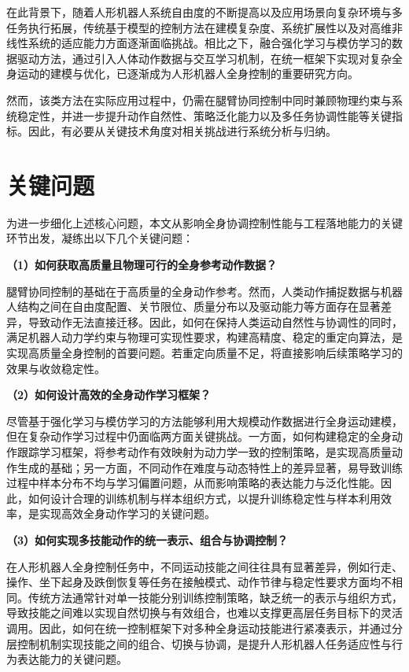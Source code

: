在此背景下，随着人形机器人系统自由度的不断提高以及应用场景向复杂环境与多任务执行拓展，传统基于模型的控制方法在建模复杂度、系统扩展性以及对高维非线性系统的适应能力方面逐渐面临挑战。相比之下，融合强化学习与模仿学习的数据驱动方法，通过引入人体动作数据与交互学习机制，在统一框架下实现对复杂全身运动的建模与优化，已逐渐成为人形机器人全身控制的重要研究方向。

然而，该类方法在实际应用过程中，仍需在腿臂协同控制中同时兼顾物理约束与系统稳定性，并进一步提升动作自然性、策略泛化能力以及多任务协调性能等关键指标。因此，有必要从关键技术角度对相关挑战进行系统分析与归纳。

\section{关键问题}

为进一步细化上述核心问题，本文从影响全身协调控制性能与工程落地能力的关键环节出发，凝练出以下几个关键问题：

\textbf{（1）如何获取高质量且物理可行的全身参考动作数据？}

腿臂协同控制的基础在于高质量的全身动作参考。然而，人类动作捕捉数据与机器人结构之间在自由度配置、关节限位、质量分布以及驱动能力等方面存在显著差异，导致动作无法直接迁移。因此，如何在保持人类运动自然性与协调性的同时，满足机器人动力学约束与物理可实现性要求，构建高精度、稳定的重定向算法，是实现高质量全身控制的首要问题。若重定向质量不足，将直接影响后续策略学习的效果与收敛稳定性。


\textbf{（2）如何设计高效的全身动作学习框架？}

尽管基于强化学习与模仿学习的方法能够利用大规模动作数据进行全身运动建模，但在复杂动作学习过程中仍面临两方面关键挑战。一方面，如何构建稳定的全身动作跟踪学习框架，将参考动作有效映射为动力学一致的控制策略，是实现高质量动作生成的基础；另一方面，不同动作在难度与动态特性上的差异显著，易导致训练过程中样本分布不均与学习偏置问题，从而影响策略的表达能力与泛化性能。因此，如何设计合理的训练机制与样本组织方式，以提升训练稳定性与样本利用效率，是实现高效全身动作学习的关键问题。

\textbf{（3）如何实现多技能动作的统一表示、组合与协调控制？}

在人形机器人全身控制任务中，不同运动技能之间往往具有显著差异，例如行走、操作、坐下起身及跌倒恢复等任务在接触模式、动作节律与稳定性要求方面均不相同。传统方法通常针对单一技能分别训练控制策略，缺乏统一的表示与组织方式，导致技能之间难以实现自然切换与有效组合，也难以支撑更高层任务目标下的灵活调用。因此，如何在统一控制框架下对多种全身运动技能进行紧凑表示，并通过分层控制机制实现技能之间的组合、切换与协调，是提升人形机器人任务适应性与行为表达能力的关键问题。


